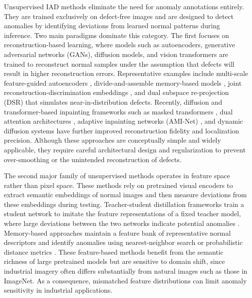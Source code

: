 Unsupervised IAD methods eliminate the need for anomaly annotations entirely. They are trained exclusively on defect-free images and are designed to detect anomalies by identifying deviations from learned normal patterns during inference. Two main paradigms dominate this category. The first focuses on reconstruction-based learning, where models such as autoencoders, generative adversarial networks (GANs), diffusion models, and vision transformers are trained to reconstruct normal samples under the assumption that defects will result in higher reconstruction errors. Representative examples include multi-scale feature-guided autoencoders \cite{shi2021dfr}, divide-and-assemble memory-based models \cite{hou2021divide}, joint reconstruction-discrimination embeddings \cite{zavrtanik2021draem}, and dual subspace re-projection (DSR) \cite{zavrtanik2022dsr} that simulates near-in-distribution defects. Recently, diffusion and transformer-based inpainting frameworks such as masked transformers \cite{de2022masked}, dual attention architectures \cite{yao2023focus}, adaptive inpainting networks (AMI-Net) \cite{luo2024ami}, and dynamic diffusion systems \cite{zhang2023unsupervised, lu2023removing, tebbe2024dynamic} have further improved reconstruction fidelity and localization precision. Although these approaches are conceptually simple and widely applicable, they require careful architectural design and regularization to prevent over-smoothing or the unintended reconstruction of defects.

The second major family of unsupervised methods operates in feature space rather than pixel space. These methods rely on pretrained visual encoders to extract semantic embeddings of normal images and then measure deviations from these embeddings during testing. Teacher-student distillation frameworks train a student network to imitate the feature representations of a fixed teacher model, where large deviations between the two networks indicate potential anomalies \cite{bergmann2020uninformed, salehi2021multiresolution, wan2022unsupervised, gu2023remembering, tong2024enhanced}. Memory-based approaches maintain a feature bank of representative normal descriptors and identify anomalies using nearest-neighbor search or probabilistic distance metrics \cite{defard2021padim, roth2022towards, bae2023pni, zuo2024reconstruction, hyun2024reconpatch}. These feature-based methods benefit from the semantic richness of large pretrained models but are sensitive to domain shift, since industrial imagery often differs substantially from natural images such as those in ImageNet. As a consequence, mismatched feature distributions can limit anomaly sensitivity in industrial applications.

